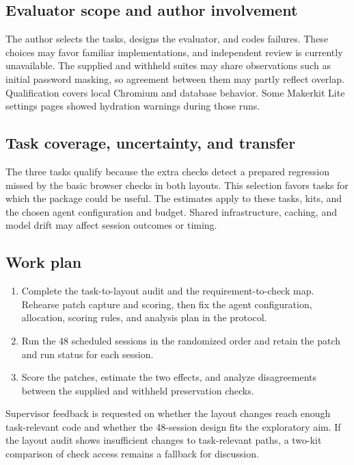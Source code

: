\documentclass[11pt,a4paper]{article}
\begin{document}
\subsection{Evaluator scope and author involvement}
The author selects the tasks, designs the evaluator, and codes failures. These choices may favor familiar implementations, and independent review is currently unavailable. The supplied and withheld suites may share observations such as initial password masking, so agreement between them may partly reflect overlap. Qualification covers local Chromium and database behavior. Some Makerkit Lite settings pages showed hydration warnings during those runs.

\subsection{Task coverage, uncertainty, and transfer}
The three tasks qualify because the extra checks detect a prepared regression missed by the basic browser checks in both layouts. This selection favors tasks for which the package could be useful. The estimates apply to these tasks, kits, and the chosen agent configuration and budget. Shared infrastructure, caching, and model drift may affect session outcomes or timing.

\begin{samepage}
\section{Work plan}
\begin{enumerate}
\item Complete the task-to-layout audit and the requirement-to-check map. Rehearse patch capture and scoring, then fix the agent configuration, allocation, scoring rules, and analysis plan in the protocol.
\item Run the 48 scheduled sessions in the randomized order and retain the patch and run status for each session.
\item Score the patches, estimate the two effects, and analyze disagreements between the supplied and withheld preservation checks.
\end{enumerate}

Supervisor feedback is requested on whether the layout changes reach enough task-relevant code and whether the 48-session design fits the exploratory aim. If the layout audit shows insufficient changes to task-relevant paths, a two-kit comparison of check access remains a fallback for discussion.
\end{samepage}

\FloatBarrier

\begingroup
\small
\setlength{\bibsep}{0pt}
\raggedright

\endgroup
\end{document}
